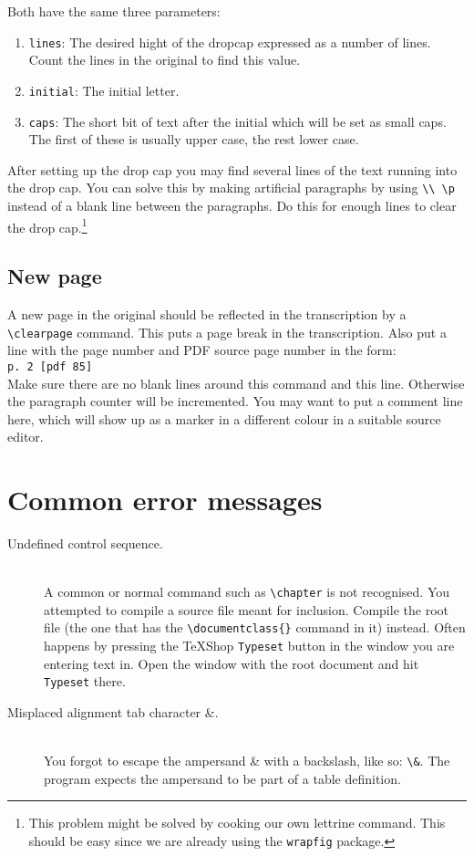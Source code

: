 \documentclass{report}
\begin{document}
Both have the same three parameters:
\begin{enumerate}
\item \texttt{lines}: The desired hight of the dropcap expressed as
a number of lines.
Count the lines in the original to find this value.
\item \texttt{initial}: The initial letter.
\item \texttt{caps}: The short bit of text after the initial which will be
set as small caps.
The first of these is usually upper case, the rest lower case.
\end{enumerate}
After setting up the drop cap you may find several lines of the text running
into the drop cap. You can solve this by making artificial paragraphs by
using \verb;\\ \p; instead of a blank line between the paragraphs. Do this
for enough lines to clear the drop cap.\footnote{This problem might be solved
by cooking our own lettrine command. This should be easy since we are already
using the \texttt{wrapfig} package.}

%
\subsection{New page}
A new page in the original should be reflected in the transcription by a
\verb;\clearpage; command. This puts a page break in the transcription.
Also put a line with the page number and PDF source page number in the form:\\
\indent\texttt{p. 2 [pdf 85]}\\
Make sure there are no blank lines around this command and this line. Otherwise
the paragraph counter will be incremented. You may want to put a comment line
here, which will show up as a marker in a different colour in a suitable
source editor.

\section{Common error messages}
\begin{description}
\item[Undefined control sequence.] \hfill \\
A common or normal command such as \verb;\chapter;
is not recognised. You attempted to compile a source file meant for inclusion. Compile the root file (the one that has the \verb;\documentclass{}; command in it) instead. Often happens by pressing the TeXShop \texttt{Typeset} button in the window you are entering text in. Open the window with the root document and hit \texttt{Typeset} there.

\item[Misplaced alignment tab character \&.] \hfill \\
You forgot to escape the ampersand \& with a backslash, like so: \verb;\&;. The program expects the ampersand to be part of a table definition.
\end{description}
\end{document}
